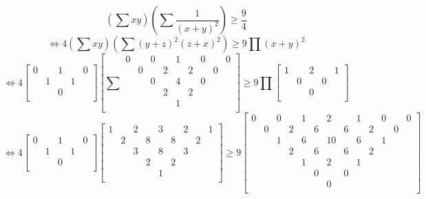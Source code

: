 \documentclass[UTF8]{ctexart}
\begin{document}
$$ (\displaystyle \sum xy)(\displaystyle \sum \dfrac{1}{(x+y)^{2}})\geq \dfrac{9}{4}$$
$$\Leftrightarrow 
4(\displaystyle \sum xy)(\displaystyle \sum (y+z)^{2}(z+x)^{2})\geq 9\prod (x+y)^{2}$$
$$\Leftrightarrow 
4\left[
\begin{smallmatrix}
	0& &1& &0\\
	&1& &1&\\
	& &0& &\\
\end{smallmatrix}
\right]
\left[\displaystyle \sum 
\begin{smallmatrix}
	0& &0& &1& &0& &0\\
	&0& &2& &2& &0&\\
	& &0& &4& &0& &\\
	& & &2& &2& & &\\
	& & & &1& & & &\\
\end{smallmatrix}
\right]\geq 9\prod 
\left[
\begin{smallmatrix}
	1& &2& &1\\
	&0& &0&\\
	& &0& &\\
\end{smallmatrix}
\right]
$$
$$\Leftrightarrow 
4\left[
\begin{smallmatrix}
	0& &1& &0\\
	&1& &1&\\
	& &0& &\\
\end{smallmatrix}
\right]
\left[
\begin{smallmatrix}
	1& &2& &3& &2& &1\\
	&2& &8& &8& &2&\\
	& &3& &8& &3& &\\
	& & &2& &2& & &\\
	& & & &1& & & &\\
\end{smallmatrix}
\right]\geq 9
\left[
\begin{smallmatrix}
	0& &0& &1& &2& &1& &0& &0\\
	&0& &2& &6& &6& &2& &0&\\
	& &1& &6& &10& &6& &1& &\\
	& & &2& &6& &6& &2& & &\\
	& & & &1& &2& &1& & & &\\
	& & & & &0& &0& & & & &\\
	& & & & & &0& & & & & &\\
\end{smallmatrix}
\right]$$
\end{document}
